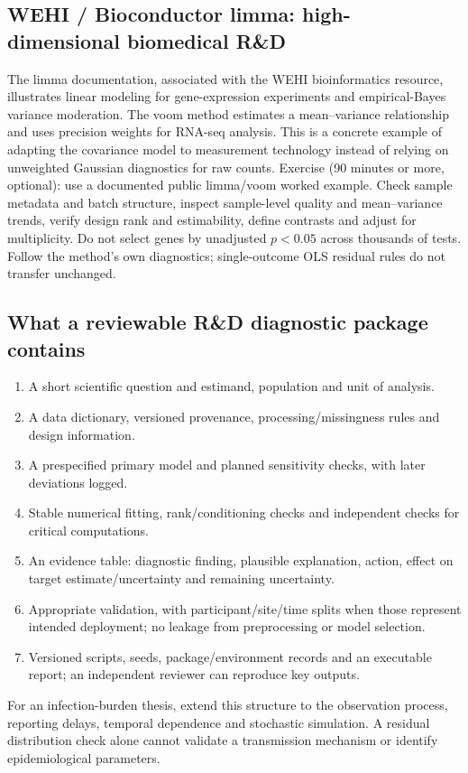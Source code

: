 \documentclass[11pt]{article}
\begin{document}
\subsection{WEHI / Bioconductor limma: high-dimensional biomedical R\&D}
The limma documentation, associated with the WEHI bioinformatics resource, illustrates linear modeling for gene-expression experiments and empirical-Bayes variance moderation. The voom method estimates a mean--variance relationship and uses precision weights for RNA-seq analysis. This is a concrete example of adapting the covariance model to measurement technology instead of relying on unweighted Gaussian diagnostics for raw counts.
Exercise (90 minutes or more, optional): use a documented public limma/voom worked example. Check sample metadata and batch structure, inspect sample-level quality and mean--variance trends, verify design rank and estimability, define contrasts and adjust for multiplicity. Do not select genes by unadjusted $p<0.05$ across thousands of tests. Follow the method's own diagnostics; single-outcome OLS residual rules do not transfer unchanged.
\subsection{What a reviewable R\&D diagnostic package contains}
\begin{enumerate}
\item A short scientific question and estimand, population and unit of analysis.
\item A data dictionary, versioned provenance, processing/missingness rules and design information.
\item A prespecified primary model and planned sensitivity checks, with later deviations logged.
\item Stable numerical fitting, rank/conditioning checks and independent checks for critical computations.
\item An evidence table: diagnostic finding, plausible explanation, action, effect on target estimate/uncertainty and remaining uncertainty.
\item Appropriate validation, with participant/site/time splits when those represent intended deployment; no leakage from preprocessing or model selection.
\item Versioned scripts, seeds, package/environment records and an executable report; an independent reviewer can reproduce key outputs.
\end{enumerate}
For an infection-burden thesis, extend this structure to the observation process, reporting delays, temporal dependence and stochastic simulation. A residual distribution check alone cannot validate a transmission mechanism or identify epidemiological parameters.
\end{document}
